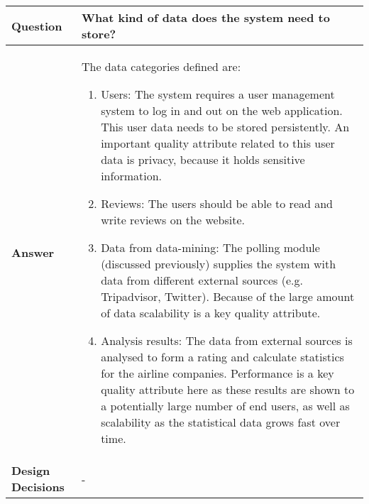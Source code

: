\begin{longtable}{| l |  p{12cm} |}
\hline
\textbf{Question} & \textbf{What kind of data does the system need to store?} \\ \hline
\textbf{Answer} &
The data categories defined are:
\begin{enumerate}
\item Users: The system requires a user management system to log in and out on the web application. This user data needs to be stored persistently. An important quality attribute related to this user data is privacy, because it holds sensitive information.
\item Reviews: The users should be able to read and write reviews on the website.
\item Data from data-mining: The polling module (discussed previously) supplies the system with data from different external sources (e.g. Tripadvisor, Twitter). Because of the large amount of data scalability is a key quality attribute.
\item Analysis results: The data from external sources is analysed to form a rating and calculate statistics for the airline companies. Performance is a key quality attribute here as these results are shown to a potentially large number of end users, as well as scalability as the statistical data grows fast over time.
\end{enumerate} \\ \hline
\textbf{Design Decisions} & - \\ \hline
\end{longtable}


